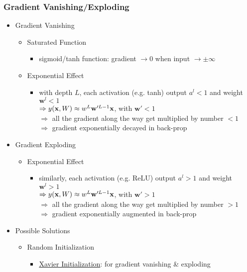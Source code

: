 \subsubsection{Gradient Vanishing/Exploding}
\begin{itemize}
\item Gradient Vanishing
	\begin{itemize}
	\item Saturated Function
		\begin{itemize}
		\item sigmoid/tanh function: gradient $\rightarrow 0$ when input $\rightarrow \pm \infty$
		\end{itemize}
	\item Exponential Effect
		\begin{itemize}
		\item with depth $L$, each activation (e.g. tanh) output $a^l < 1$ and weight $\mathbf w^l <1$ \\ 
		$\Rightarrow y(\mathbf x, W) \approx \mathbf \mathbf w^L \mathbf w'^{L-1} \mathbf x$, with $\mathbf w'<1$ \\
		$\Rightarrow$ all the gradient along the way get multiplied by number $<1$ \\
		$\Rightarrow$ gradient exponentially decayed in back-prop
		\end{itemize}
	\end{itemize}
\item Gradient Exploding
	\begin{itemize}
	\item Exponential Effect
		\begin{itemize}
		\item similarly, each activation (e.g. ReLU) output $a^l>1$ and weight $\mathbf w^l > 1$ \\
		$\Rightarrow y(\mathbf x, W) \approx \mathbf \mathbf w^L \mathbf w'^{L-1} \mathbf x$, with $\mathbf w'>1$ \\
		$\Rightarrow$ all the gradient along the way get multiplied by number $>1$ \\
		$\Rightarrow$ gradient exponentially augmented in back-prop
		\end{itemize}
	\end{itemize}
\item Possible Solutions
	\begin{itemize}
	\item Random Initialization
		\begin{itemize}
		\item \hyperref[DL_Init_Xavier]{Xavier Initialization}: for gradient vanishing \& exploding

\end{itemize}
\end{itemize}
\end{itemize}
